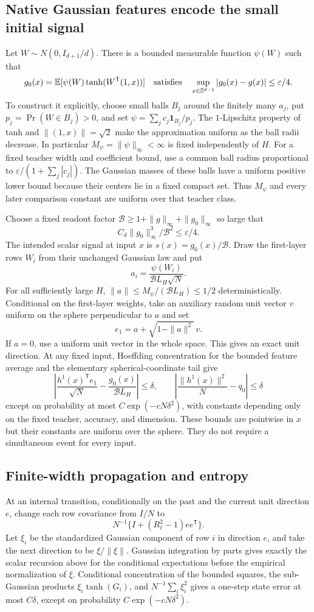\subsection{Native Gaussian features encode the small initial signal}
Let $W\sim N(0,I_{d+1}/d)$. There is a bounded measurable function $\psi(W)$ such that
\[
 g_0(x)=\mathbb E[\psi(W)\tanh(W^{\mathsf T}(1,x))]
 \quad\hbox{satisfies}\quad
 \sup_{x\in\mathbb S^{d-1}}|g_0(x)-g(x)|\le\varepsilon/4.
\]
To construct it explicitly, choose small balls $B_j$ around the finitely many $a_j$, put $p_j=\Pr(W\in B_j)>0$, and set $\psi=\sum_j c_j\mathbf1_{B_j}/p_j$. The $1$-Lipschitz property of tanh and $\|(1,x)\|=\sqrt2$ make the approximation uniform as the ball radii decrease. In particular $M_\psi=\|\psi\|_\infty<\infty$ is fixed independently of $H$. For a fixed teacher width and coefficient bound, use a common ball radius proportional to $\varepsilon/(1+\sum_j|c_j|)$. The Gaussian masses of these balls have a uniform positive lower bound because their centers lie in a fixed compact set. Thus $M_\psi$ and every later comparison constant are uniform over that teacher class.

Choose a fixed readout factor $\mathcal B\ge1+\|g\|_\infty+\|g_0\|_\infty$ so large that
\[
 C_d\|g_0\|_\infty^3/\mathcal B^2\le\varepsilon/4.
\]
The intended scalar signal at input $x$ is $s(x)=g_0(x)/\mathcal B$. Draw the first-layer rows $W_i$ from their unchanged Gaussian law and put
\[
 a_i=\frac{\psi(W_i)}{\mathcal B L_H\sqrt N}.
\]
For all sufficiently large $H$, $\|a\|\le M_\psi/(\mathcal B L_H)\le1/2$ deterministically. Conditional on the first-layer weights, take an auxiliary random unit vector $v$ uniform on the sphere perpendicular to $a$ and set
\[
 e_1=a+\sqrt{1-\|a\|^2}\,v.
\]
If $a=0$, use a uniform unit vector in the whole space. This gives an exact unit direction. At any fixed input, Hoeffding concentration for the bounded feature average and the elementary spherical-coordinate tail give
\[
 \left|\frac{h^1(x)^{\mathsf T}e_1}{\sqrt N}
           -\frac{g_0(x)}{\mathcal B L_H}\right|\le\delta,
 \qquad
 \left|\frac{\|h^1(x)\|^2}{N}-q_0\right|\le\delta
\]
except on probability at most $C\exp(-cN\delta^2)$, with constants depending only on the fixed teacher, accuracy, and dimension. These bounds are pointwise in $x$ but their constants are uniform over the sphere. They do not require a simultaneous event for every input.

\subsection{Finite-width propagation and entropy}
At an internal transition, conditionally on the past and the current unit direction $e$, change each row covariance from $I/N$ to
\[
 N^{-1}\{I+(R_\ell^2-1)ee^{\mathsf T}\}.
\]
Let $\xi_i$ be the standardized Gaussian component of row $i$ in direction $e$, and take the next direction to be $\xi/\|\xi\|$. Gaussian integration by parts gives exactly the scalar recursion above for the conditional expectations before the empirical normalization of $\xi$. Conditional concentration of the bounded squares, the sub-Gaussian products $\xi_i\tanh(G_i)$, and $N^{-1}\sum_i\xi_i^2$ gives a one-step state error at most $C\delta$, except on probability $C\exp(-cN\delta^2)$.

